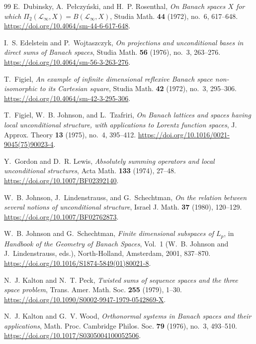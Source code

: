 \documentclass[11pt,a4paper,reqno]{amsart}
\theoremstyle{definition}
\numberwithin{equation}{section}
\begin{document}
\begin{thebibliography}{99}
E.~Dubinsky, A.~Pe\l czy\'nski, and H.~P. Rosenthal, \emph{On Banach spaces $X$ for which $\Pi_2(\mathcal L_\infty,X)=B(\mathcal L_\infty,X)$}, Studia Math. \textbf{44} (1972), no.~6, 617--648. \url{https://doi.org/10.4064/sm-44-6-617-648}.

I.~S. Edelstein and P.~Wojtaszczyk, \emph{On projections and unconditional bases in direct sums of Banach spaces}, Studia Math. \textbf{56} (1976), no.~3, 263--276. \url{https://doi.org/10.4064/sm-56-3-263-276}.

T.~Figiel, \emph{An example of infinite dimensional reflexive Banach space non-isomorphic to its Cartesian square}, Studia Math. \textbf{42} (1972), no.~3, 295--306. \url{https://doi.org/10.4064/sm-42-3-295-306}.

T.~Figiel, W.~B. Johnson, and L.~Tzafriri, \emph{On Banach lattices and spaces having local unconditional structure, with applications to Lorentz function spaces}, J. Approx. Theory \textbf{13} (1975), no.~4, 395--412. \url{https://doi.org/10.1016/0021-9045(75)90023-4}.

Y.~Gordon and D.~R. Lewis, \emph{Absolutely summing operators and local unconditional structures}, Acta Math. \textbf{133} (1974), 27--48. \url{https://doi.org/10.1007/BF02392140}.

W.~B. Johnson, J.~Lindenstrauss, and G.~Schechtman, \emph{On the relation between several notions of unconditional structure}, Israel J. Math. \textbf{37} (1980), 120--129. \url{https://doi.org/10.1007/BF02762873}.

W.~B. Johnson and G.~Schechtman, \emph{Finite dimensional subspaces of $L_p$}, in \emph{Handbook of the Geometry of Banach Spaces}, Vol.~1 (W.~B. Johnson and J.~Lindenstrauss, eds.), North-Holland, Amsterdam, 2001, 837--870. \url{https://doi.org/10.1016/S1874-5849(01)80021-8}.

N.~J. Kalton and N.~T. Peck, \emph{Twisted sums of sequence spaces and the three space problem}, Trans. Amer. Math. Soc. \textbf{255} (1979), 1--30. \url{https://doi.org/10.1090/S0002-9947-1979-0542869-X}.

N.~J. Kalton and G.~V. Wood, \emph{Orthonormal systems in Banach spaces and their applications}, Math. Proc. Cambridge Philos. Soc. \textbf{79} (1976), no.~3, 493--510. \url{https://doi.org/10.1017/S0305004100052506}.


\end{thebibliography}
\end{document}
